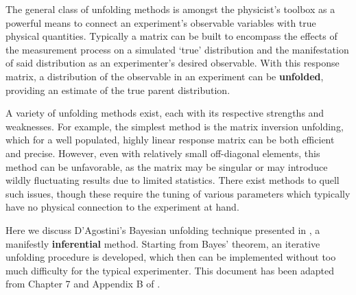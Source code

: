 The general class of unfolding methods is amongst the physicist's toolbox as a powerful 
means to connect an experiment's observable variables with true physical quantities.
Typically a matrix can be built to encompass the effects of the measurement process
on a simulated `true' distribution and the manifestation of said distribution as an 
experimenter's desired observable. With this response matrix, a distribution of 
the observable in an experiment can be \textbf{unfolded}, providing an estimate of the 
true parent distribution.

A variety of unfolding methods exist, each with its respective strengths and weaknesses.
For example, the simplest method is the matrix inversion unfolding, which for a well 
populated, highly linear response matrix can be both efficient and precise.
However, even with relatively small off-diagonal elements, this method can be unfavorable,
as the matrix may be singular or may introduce wildly fluctuating results due to limited 
statistics. There exist methods to quell such issues, though these require the tuning
of various parameters which typically have no physical connection to the experiment at hand.

Here we discuss D'Agostini's Bayesian unfolding technique presented in \cite{agostini}, a manifestly 
\textbf{inferential} method.
Starting from Bayes' theorem, an iterative unfolding procedure is developed, 
which then can be implemented without too much difficulty for the typical experimenter.
This document has been adapted from Chapter 7 and Appendix B of \cite{zhampel-thesis}.
